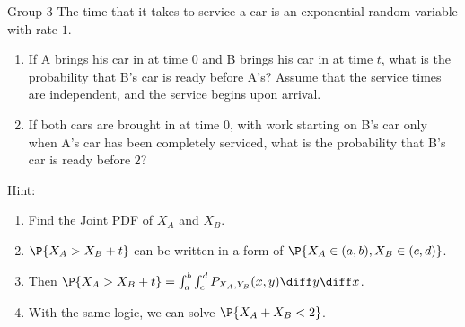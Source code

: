 \documentclass{article}
\theoremstyle{plain}
\theoremstyle{definition}
\theoremstyle{remark}
\begin{document}
\begin{problem}
    {Group 3}
    The time that it takes to service a car is an exponential random variable with rate $1$.
    \begin{enumerate}
        \item If A brings his car in at time $0$ and B brings his car in at time $t$, what is the probability that B's car is ready before A's? Assume that the service times are independent, and the service begins upon arrival.
        \item If both cars are brought in at time $0$, with work starting on B's car only when A's car has been completely serviced, what is the probability that B's car is ready before $2$?
    \end{enumerate}
    \begin{solution}
        {Hint:}
        \begin{enumerate}
            \item Find the Joint PDF of $X_A$ and $X_B$.
            \item $\P{X_A>X_B+t}$ can be written in a form of $\P{X_A\in(a,b), X_B\in(c,d)}$.
            \item Then $\P{X_A>X_B+t}=\int_{a}^{b}\int_{c}^{d}P_{X_A,Y_B}(x,y)\diff y \diff x$.
            \item With the same logic, we can solve $\P{X_A+X_B<2}$.
        \end{enumerate}
    \end{solution}
\end{problem}
\end{document}
